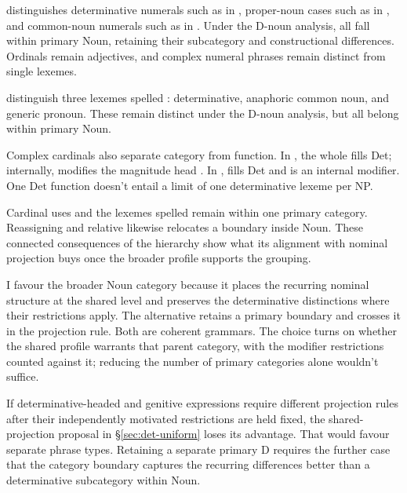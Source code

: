 \documentclass[12pt]{article}
\begin{document}
\textcite{reynolds2026numerals} distinguishes determinative numerals such as  in , proper-noun cases such as  in , and common-noun numerals such as  in . Under the D-noun analysis, all fall within primary Noun, retaining their subcategory and constructional differences. Ordinals remain adjectives, and complex numeral phrases remain distinct from single lexemes.

\textcite[797--798]{payne2013anaphoric} distinguish three lexemes spelled : determinative, anaphoric common noun, and generic pronoun. These remain distinct under the D-noun analysis, but all belong within primary Noun.

Complex cardinals also separate category from function. In , the whole  fills Det; internally,  modifies the magnitude head  \citep[§4]{reynolds2026numerals}. In ,  fills Det and  is an internal modifier. One Det function doesn't entail a limit of one determinative lexeme per NP.

Cardinal uses and the lexemes spelled  remain within one primary category. Reassigning  and relative  likewise relocates a boundary inside Noun. These connected consequences of the hierarchy show what its alignment with nominal projection buys once the broader profile supports the grouping.

I favour the broader Noun category because it places the recurring nominal structure at the shared level and preserves the determinative distinctions where their restrictions apply. The alternative retains a primary boundary and crosses it in the projection rule. Both are coherent grammars. The choice turns on whether the shared profile warrants that parent category, with the modifier restrictions counted against it; reducing the number of primary categories alone wouldn't suffice.

If determinative-headed and genitive expressions require different projection rules after their independently motivated restrictions are held fixed, the shared-projection proposal in §\ref{sec:det-uniform} loses its advantage. That would favour separate phrase types. Retaining a separate primary D requires the further case that the category boundary captures the recurring differences better than a determinative subcategory within Noun.
\end{document}
